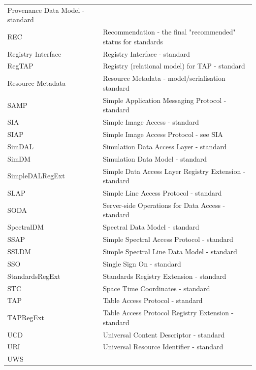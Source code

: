 \documentclass[11pt,letter]{ivoa}
\begin{document}
{\begin{longtable}[t]{l l}
        {Provenance Data Model - standard} \\
        {REC} &
{Recommendation - the final "recommended" status for standards} \\        {Registry Interface} &
        {Registry Interface - standard} \\
        {RegTAP} &
        {Registry (relational model) for TAP - standard} \\
        {Resource Metadata} &
        {Resource Metadata - model/serialisation standard} \\
        {SAMP} &
        {Simple Application Messaging Protocol - standard} \\
        {SIA} &
        {Simple Image Access - standard} \\
        {SIAP} &
        {Simple Image Access Protocol - see SIA}  \\
        {SimDAL} &
        {Simulation Data Access Layer - standard} \\
        {SimDM} &
        {Simulation Data Model - standard} \\
        {SimpleDALRegExt} &
        {Simple Data Access Layer Registry Extension - standard} \\
        {SLAP} &
        {Simple Line Access Protocol - standard} \\
        {SODA}  &
        {Server-side Operations for Data Access - standard} \\
        {SpectralDM} &
        {Spectral Data Model - standard} \\
        {SSAP} &
        {Simple Spectral Access Protocol - standard} \\
        {SSLDM} &
        {Simple Spectral Line Data Model - standard} \\
        {SSO} &
        {Single Sign On - standard} \\
        {StandardsRegExt} &
        {Standards Registry Extension - standard} \\
        {STC} &
        {Space Time Coordinates - standard} \\
        {TAP} &
        {Table Access Protocol - standard} \\
        {TAPRegExt} &
        {Table Access Protocol Registry Extension - standard} \\
        {UCD} &
        {Universal Content Descriptor - standard} \\
        {URI}  &
        {Universal Resource Identifier - standard} \\
        {UWS}  &

\end{longtable}}
\end{document}
